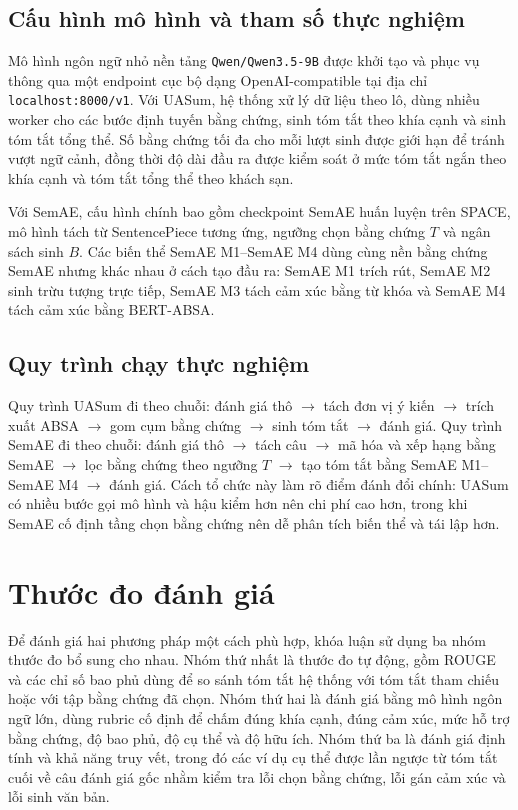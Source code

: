 \subsection{Cấu hình mô hình và tham số thực nghiệm}

Mô hình ngôn ngữ nhỏ nền tảng \texttt{Qwen/Qwen3.5-9B} được khởi tạo và phục vụ thông qua một endpoint cục bộ dạng OpenAI-compatible tại địa chỉ \texttt{localhost:8000/v1}. Với UASum, hệ thống xử lý dữ liệu theo lô, dùng nhiều worker cho các bước định tuyến bằng chứng, sinh tóm tắt theo khía cạnh và sinh tóm tắt tổng thể. Số bằng chứng tối đa cho mỗi lượt sinh được giới hạn để tránh vượt ngữ cảnh, đồng thời độ dài đầu ra được kiểm soát ở mức tóm tắt ngắn theo khía cạnh và tóm tắt tổng thể theo khách sạn.

Với SemAE, cấu hình chính bao gồm checkpoint SemAE huấn luyện trên SPACE, mô hình tách từ SentencePiece tương ứng, ngưỡng chọn bằng chứng $T$ và ngân sách sinh $B$. Các biến thể SemAE M1--SemAE M4 dùng cùng nền bằng chứng SemAE nhưng khác nhau ở cách tạo đầu ra: SemAE M1 trích rút, SemAE M2 sinh trừu tượng trực tiếp, SemAE M3 tách cảm xúc bằng từ khóa và SemAE M4 tách cảm xúc bằng BERT-ABSA.

\subsection{Quy trình chạy thực nghiệm}

Quy trình UASum đi theo chuỗi: đánh giá thô $\rightarrow$ tách đơn vị ý kiến $\rightarrow$ trích xuất ABSA $\rightarrow$ gom cụm bằng chứng $\rightarrow$ sinh tóm tắt $\rightarrow$ đánh giá. Quy trình SemAE đi theo chuỗi: đánh giá thô $\rightarrow$ tách câu $\rightarrow$ mã hóa và xếp hạng bằng SemAE $\rightarrow$ lọc bằng chứng theo ngưỡng $T$ $\rightarrow$ tạo tóm tắt bằng SemAE M1--SemAE M4 $\rightarrow$ đánh giá. Cách tổ chức này làm rõ điểm đánh đổi chính: UASum có nhiều bước gọi mô hình và hậu kiểm hơn nên chi phí cao hơn, trong khi SemAE cố định tầng chọn bằng chứng nên dễ phân tích biến thể và tái lập hơn.
\section{Thước đo đánh giá}
\label{sec:evaluation-metrics}

Để đánh giá hai phương pháp một cách phù hợp, khóa luận sử dụng ba nhóm thước đo bổ sung cho nhau. Nhóm thứ nhất là thước đo tự động, gồm ROUGE và các chỉ số bao phủ dùng để so sánh tóm tắt hệ thống với tóm tắt tham chiếu hoặc với tập bằng chứng đã chọn. Nhóm thứ hai là đánh giá bằng mô hình ngôn ngữ lớn, dùng rubric cố định để chấm đúng khía cạnh, đúng cảm xúc, mức hỗ trợ bằng chứng, độ bao phủ, độ cụ thể và độ hữu ích. Nhóm thứ ba là đánh giá định tính và khả năng truy vết, trong đó các ví dụ cụ thể được lần ngược từ tóm tắt cuối về câu đánh giá gốc nhằm kiểm tra lỗi chọn bằng chứng, lỗi gán cảm xúc và lỗi sinh văn bản.

